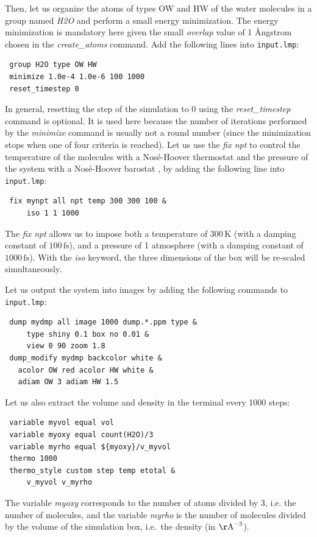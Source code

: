 \documentclass[9pt,tutorial]{livecoms}
\newcommand{\flecmd}[1]{\textcolor{command}{\texttt{#1}}} %
\begin{document}
Then, let us organize the atoms of types OW and HW of the water molecules in a
group named \textit{H2O} and perform a small energy minimization. The energy
minimization is mandatory here given the small \textit{overlap} value of 1 Ångstrom
chosen in the \textit{create\_atoms} command. Add the following lines into \flecmd{input.lmp}:
\begin{lstlisting}
 group H2O type OW HW
 minimize 1.0e-4 1.0e-6 100 1000
 reset_timestep 0
\end{lstlisting}
In general, resetting the step of the simulation to 0 using the
\textit{reset\_timestep} command is optional.
It is used here because the number of iterations performed by the \textit{minimize}
command is usually not a round number (since the minimization stops when one of
four criteria is reached). Let us use the \textit{fix npt} to control the temperature
of the molecules with a Nosé-Hoover thermostat and the pressure of the system with
a Nosé-Hoover barostat \cite{nose1984unified, hoover1985canonical, martyna1994constant},
by adding the following line into \flecmd{input.lmp}:
\begin{lstlisting}
 fix mynpt all npt temp 300 300 100 &
     iso 1 1 1000
\end{lstlisting}
The \textit{fix npt} allows us to impose both a temperature of $300\,\text{K}$
(with a damping constant of $100\,\text{fs}$), and a pressure of 1 atmosphere
(with a damping constant of $1000\,\text{fs}$). With the \textit{iso} keyword,
the three dimensions of the box will be re-scaled simultaneously.

Let us output the system into images by adding the following commands to \flecmd{input.lmp}:
\begin{lstlisting}
 dump mydmp all image 1000 dump.*.ppm type &
     type shiny 0.1 box no 0.01 &
     view 0 90 zoom 1.8
 dump_modify mydmp backcolor white &
   acolor OW red acolor HW white &
   adiam OW 3 adiam HW 1.5
\end{lstlisting}
Let us also extract the volume and density in the terminal every 1000 steps:
\begin{lstlisting}
 variable myvol equal vol
 variable myoxy equal count(H2O)/3
 variable myrho equal ${myoxy}/v_myvol
 thermo 1000
 thermo_style custom step temp etotal &
     v_myvol v_myrho
\end{lstlisting}
The variable \textit{myoxy} corresponds to the number of atoms divided by 3, i.e.
the number of molecules, and the variable \textit{myrho} is the number of molecules
divided by the volume of the simulation box, i.e.~the density (in $\mathrm{\AA{}}^{-3}$).
\end{document}
